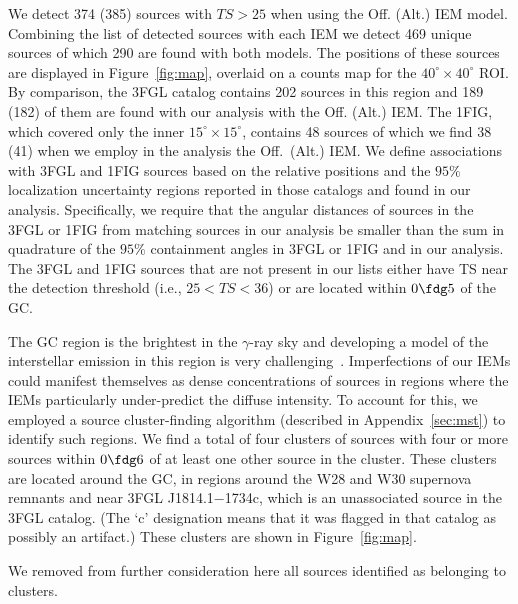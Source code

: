 \documentclass[iop]{emulateapj}
\begin{document}
We detect 374 (385) sources with $TS>25$ when using the Off. (Alt.)
IEM model.  Combining the list of detected sources with each IEM we detect 469 unique
sources of which 290 are found with both models.  The positions of
these sources are displayed in Figure~\ref{fig:map}, overlaid on a
counts map for the $40^\circ\times40^\circ$ ROI.  By comparison, the
3FGL catalog contains 202 sources in this region and 189 (182) of them
are found with our analysis with the Off. (Alt.)  IEM. The 1FIG,
which covered only the inner $15^{\circ}\times15^{\circ}$, contains 48 sources of
which we find 38 (41) when we employ in the analysis the
Off.~(Alt.) IEM.  We define associations with 3FGL and 1FIG sources
based on the relative positions and the $95\%$ localization uncertainty regions
reported in those catalogs and found in our analysis.  Specifically,
we require that the angular distances of sources in the 3FGL or 1FIG
from matching sources in our analysis be smaller than the sum in quadrature of
the $95\%$ containment angles in 3FGL or 1FIG and in our analysis.
The 3FGL and 1FIG sources that are not present in our lists either
have TS near the detection threshold (i.e., $25<TS<36$) or are
located within $0\fdg5$ of the GC.

The GC region is the brightest in the $\gamma$-ray sky and developing
a model of the interstellar emission in this region is very
challenging~\citep[see, e.g.,][]{Calore:2014xka,
  2016ApJ...819...44A, TheFermi-LAT:2017vmf}.  
Imperfections of our IEMs could manifest themselves
as dense concentrations of sources in regions where the IEMs particularly under-predict the diffuse intensity.  
To account for this, we
employed a source cluster-finding algorithm (described in
Appendix~\ref{sec:mst}) to identify such regions.  We
find a total of four clusters of sources with four or more sources
within $0\fdg6$ of at least one other source in the cluster.  These
clusters are located around the GC, in regions around the W28 and W30
supernova remnants and near 3FGL J1814.1$-$1734c, which is an
unassociated source in the 3FGL catalog.  (The `c' designation means
that it was flagged in that catalog as possibly an artifact.) These
clusters are shown in Figure~\ref{fig:map}.

We removed from further consideration here all sources identified as
belonging to clusters.
\end{document}
